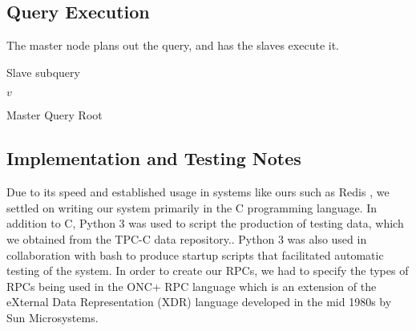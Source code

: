 \subsection{Query Execution}
The master node plans out the query, and has the slaves execute it.
\begin{algorithm}
    \begin{algorithmic}
        \Else
         \EndIf
    \end{algorithmic}
    \caption{Slave subquery}
\end{algorithm}

\begin{algorithm}
    \begin{algorithmic}
      \EndFor
      \EndFor
      \Return $v$
    \end{algorithmic}
  \caption{Master Query Root}
\end{algorithm}
\subsection{Implementation and Testing Notes}
Due to its speed and established usage in systems like ours such as Redis \cite{https://github.com/antirez/redis}, we settled on writing our system primarily in the C programming language.
In addition to C, Python 3 was used to script the production of testing data,
which we obtained from the TPC-C data repository..
Python 3 was also used in collaboration with bash to produce startup scripts that facilitated automatic testing of the system.
In order to create our RPCs, we had to specify the types of RPCs being used in the ONC+ RPC language which is an extension of the eXternal Data Representation (XDR) language developed in the mid 1980s by Sun Microsystems.

